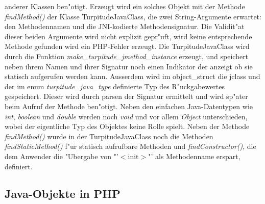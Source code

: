 anderer Klassen ben"otigt. Erzeugt wird ein solches Objekt mit der Methode \emph{findMethod()} der Klasse TurpitudeJavaClass, die zwei 
String-Argumente erwartet: den Methodennamen und die JNI-kodierte Methodensignatur. Die Validit"at dieser beiden Argumente wird nicht explizit
gepr"uft, wird keine entsprechende Methode gefunden wird ein PHP-Fehler erzeugt. Die TurpitudeJavaClass wird durch die Funktion
\emph{make\_turpitude\_jmethod\_instance} erzeugt, und speichert neben ihrem Namen und ihrer Signatur noch einen Indikator der anzeigt
ob sie statisch aufgerufen werden kann. Ausserdem wird im object\_struct die jclass und der im enum \emph{turpitude\_java\_type} definierte
Typ des R"uckgabewertes gespeichert. Dieser wird durch parsen der Signatur ermittelt und wird sp"ater beim Aufruf der Methode ben"otigt.
Neben den einfachen Java-Datentypen wie \emph{int}, \emph{boolean} und \emph{double} werden noch \emph{void} und vor allem \emph{Object} unterschieden,
wobei der eigentliche Typ des Objektes keine Rolle spielt.
Neben der Methode \emph{findMethod()} wurde in der TurpitudeJavaClass noch die Methoden \emph{findStaticMethod()} f"ur statisch
aufrufbare Methoden und \emph{findConstructor()}, die dem Anwender die "Ubergabe von "'$<$init$>$"' als Methodenname erspart, definiert.

\subsection{Java-Objekte in PHP}
\label{sec:chap1:impl:5}

